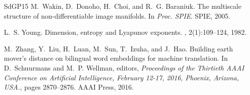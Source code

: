 \documentclass[sts]{imsart}
\begin{document}
\begin{thebibliography}{SdGP{\etalchar{+}}15}
M.~Wakin, D.~Donoho, H.~Choi, and R.~G. Baraniuk.
\newblock The multiscale structure of non-differentiable image manifolds.
\newblock In {\em Proc. SPIE}. SPIE, 2005.

L.~S. Young.
\newblock Dimension, entropy and {L}yapunov exponents.
, 2(1):109--124, 1982.

M.~Zhang, Y.~Liu, H.~Luan, M.~Sun, T.~Izuha, and J.~Hao.
\newblock Building earth mover's distance on bilingual word embeddings for
  machine translation.
\newblock In D.~Schuurmans and M.~P. Wellman, editors, {\em Proceedings of the
  Thirtieth {AAAI} Conference on Artificial Intelligence, February 12-17, 2016,
  Phoenix, Arizona, {USA.}}, pages 2870--2876. {AAAI} Press, 2016.

\end{thebibliography}
\end{document}
